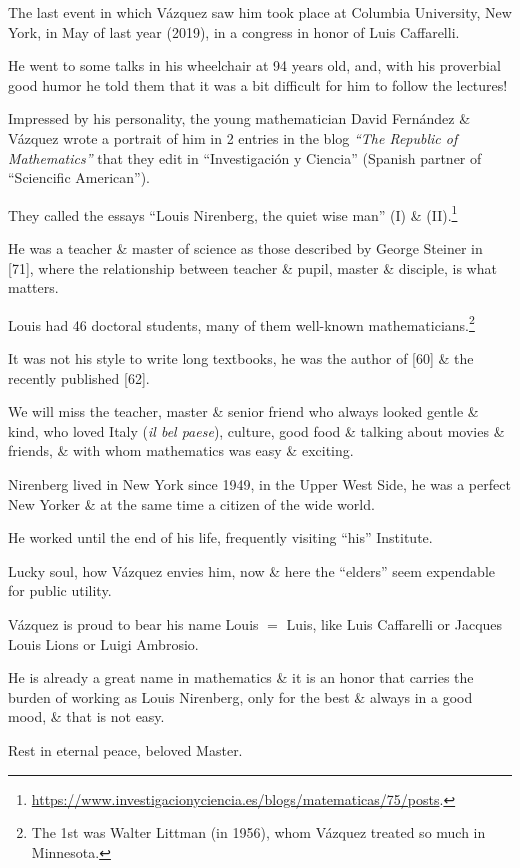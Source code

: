 \documentclass{article}
\begin{document}
The last event in which V\'azquez saw him took place at Columbia University, New York, in May of last year (2019), in a congress in honor of Luis Caffarelli.

He went to some talks in his wheelchair at 94 years old, and, with his proverbial good humor he told them that it was a bit difficult for him to follow the lectures!

%
Impressed by his personality, the young mathematician David Fern\'andez \& V\'azquez wrote a portrait of him in 2 entries in the blog \textit{``The Republic of Mathematics''} that they edit in ``Investigaci\'on y Ciencia'' (Spanish partner of ``Sciencific American'').

They called the essays ``Louis Nirenberg, the quiet wise man'' (I) \& (II).\footnote{\url{https://www.investigacionyciencia.es/blogs/matematicas/75/posts}.}

He was a teacher \& master of science as those described by George Steiner in [71], where the relationship between teacher \& pupil, master \& disciple, is what matters.

Louis had 46 doctoral students, many of them well-known mathematicians.\footnote{The 1st was Walter Littman (in 1956), whom V\'azquez treated so much in Minnesota.}

It was not his style to write long textbooks, he was the author of [60] \& the recently published [62].

%
We will miss the teacher, master \& senior friend who always looked gentle \& kind, who loved Italy (\textit{il bel paese}), culture, good food \& talking about movies \& friends, \& with whom mathematics was easy \& exciting.

Nirenberg lived in New York since 1949, in the Upper West Side, he was a perfect New Yorker \& at the same time a citizen of the wide world.

He worked until the end of his life, frequently visiting ``his'' Institute.

Lucky soul, how V\'azquez envies him, now \& here the ``elders'' seem expendable for public utility.

%
V\'azquez is proud to bear his name Louis $=$ Luis, like Luis Caffarelli or Jacques Louis Lions or Luigi Ambrosio.

He is already a great name in mathematics \& it is an honor that carries the burden of working as Louis Nirenberg, only for the best \& always in a good mood, \& that is not easy.

Rest in eternal peace, beloved Master.
\end{document}

